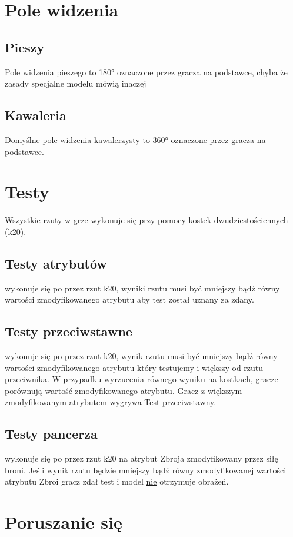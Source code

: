 \section{Pole widzenia}

\subsection{Pieszy}
Pole widzenia pieszego to \ang{180} oznaczone przez gracza na podstawce, chyba że zasady specjalne modelu mówią inaczej

\subsection{Kawaleria}
Domyślne pole widzenia kawalerzysty to \ang{360} oznaczone przez gracza na podstawce. 


\section{Testy}

Wszystkie rzuty w grze wykonuje się przy pomocy kostek dwudziestościennych (k20).

\subsection{Testy atrybutów} wykonuje się po przez rzut k20, wyniki rzutu musi być mniejszy bądź równy wartości zmodyfikowanego atrybutu aby test został uznany za zdany. 

\subsection{Testy przeciwstawne} wykonuje się po przez rzut k20, wynik rzutu musi być mniejszy bądź równy wartości zmodyfikowanego atrybutu który testujemy i większy od rzutu przeciwnika. W przypadku wyrzucenia równego wyniku na kostkach, gracze porównują wartość zmodyfikowanego atrybutu. Gracz z większym zmodyfikowanym atrybutem wygrywa Test przeciwstawny. 
\subsection{Testy pancerza} wykonuje się po przez rzut k20 na atrybut Zbroja zmodyfikowany przez siłę broni. Jeśli wynik rzutu będzie mniejszy bądź równy zmodyfikowanej wartości atrybutu Zbroi gracz zdał test i model \underline{nie} otrzymuje obrażeń.


\section{Poruszanie się}
